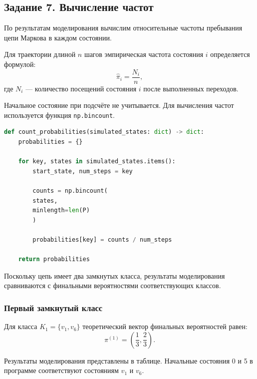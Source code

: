 \documentclass[a4paper, final]{article}
\begin{document}
\subsection*{Задание 7. Вычисление частот}

По результатам моделирования вычислим относительные
частоты пребывания цепи Маркова в каждом состоянии.

Для траектории длиной $n$ шагов эмпирическая
частота состояния $i$ определяется формулой:
\[
\hat{\pi}_i=\frac{N_i}{n},
\]
где $N_i$ --- количество посещений состояния $i$
после выполненных переходов.

Начальное состояние при подсчёте не учитывается.
Для вычисления частот используется функция
\texttt{np.bincount}.


\begin{lstlisting}[language=Python,
	caption={Вычисление эмпирических частот}]
def count_probabilities(simulated_states: dict) -> dict:
	probabilities = {}
	
	for key, states in simulated_states.items():
		start_state, num_steps = key
		
		counts = np.bincount(
		states,
		minlength=len(P)
		)
		
		probabilities[key] = counts / num_steps
		
	return probabilities
\end{lstlisting}

Поскольку цепь имеет два замкнутых класса,
результаты моделирования сравниваются с финальными
вероятностями соответствующих классов.

\subsubsection*{Первый замкнутый класс}

Для класса $K_1=\{v_1,v_6\}$ теоретический вектор
финальных вероятностей равен:
\[
\pi^{(1)}=\left(\frac13,\frac23\right).
\]

Результаты моделирования представлены в таблице.
Начальные состояния 0 и 5 в программе соответствуют
состояниям $v_1$ и $v_6$.
\end{document}
